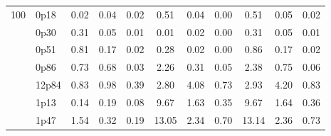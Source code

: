 \documentclass[12pt,A4paper]{article}
\begin{document}
\begin{table}[]
\begin{tabular}{lllllllllll}
\multicolumn{1}{|l|}{\multirow{13}{*}{100}} & \multicolumn{1}{l|}{0p18} & \multicolumn{1}{c|}{0.02}        & \multicolumn{1}{c|}{0.04}         & \multicolumn{1}{c|}{0.02}        & \multicolumn{1}{c|}{0.51}         & \multicolumn{1}{c|}{0.04}        & \multicolumn{1}{c|}{0.00}         & \multicolumn{1}{c|}{0.51}         & \multicolumn{1}{c|}{0.05}         & \multicolumn{1}{c|}{0.02}         \\ \cline{2-11} 
\multicolumn{1}{|l|}{} & \multicolumn{1}{l|}{0p30} & \multicolumn{1}{c|}{0.31}        & \multicolumn{1}{c|}{0.05}         & \multicolumn{1}{c|}{0.01}        & \multicolumn{1}{c|}{0.01}         & \multicolumn{1}{c|}{0.02}        & \multicolumn{1}{c|}{0.00}        & \multicolumn{1}{c|}{0.31}        & \multicolumn{1}{c|}{0.05}        & \multicolumn{1}{c|}{0.01}         \\ \cline{2-11}
\multicolumn{1}{|l|}{} & \multicolumn{1}{l|}{0p51} & \multicolumn{1}{c|}{0.81}        & \multicolumn{1}{c|}{0.17}         & \multicolumn{1}{c|}{0.02}        & \multicolumn{1}{c|}{0.28}         & \multicolumn{1}{c|}{0.02}        & \multicolumn{1}{c|}{0.00}        & \multicolumn{1}{c|}{0.86}        & \multicolumn{1}{c|}{0.17}        & \multicolumn{1}{c|}{0.02}         \\ \cline{2-11}
\multicolumn{1}{|l|}{} & \multicolumn{1}{l|}{0p86} & \multicolumn{1}{c|}{0.73}        & \multicolumn{1}{c|}{0.68}         & \multicolumn{1}{c|}{0.03}        & \multicolumn{1}{c|}{2.26}         & \multicolumn{1}{c|}{0.31}        & \multicolumn{1}{c|}{0.05}        & \multicolumn{1}{c|}{2.38}        & \multicolumn{1}{c|}{0.75}        & \multicolumn{1}{c|}{0.06}         \\ \cline{2-11}
\multicolumn{1}{|l|}{} & \multicolumn{1}{l|}{12p84} & \multicolumn{1}{c|}{0.83}        & \multicolumn{1}{c|}{0.98}         & \multicolumn{1}{c|}{0.39}        & \multicolumn{1}{c|}{2.80}         & \multicolumn{1}{c|}{4.08}        & \multicolumn{1}{c|}{0.73}        & \multicolumn{1}{c|}{2.93}        & \multicolumn{1}{c|}{4.20}        & \multicolumn{1}{c|}{0.83}         \\ \cline{2-11}
\multicolumn{1}{|l|}{} & \multicolumn{1}{l|}{1p13} & \multicolumn{1}{c|}{0.14}        & \multicolumn{1}{c|}{0.19}         & \multicolumn{1}{c|}{0.08}        & \multicolumn{1}{c|}{9.67}         & \multicolumn{1}{c|}{1.63}        & \multicolumn{1}{c|}{0.35}        & \multicolumn{1}{c|}{9.67}        & \multicolumn{1}{c|}{1.64}        & \multicolumn{1}{c|}{0.36}         \\ \cline{2-11}
\multicolumn{1}{|l|}{} & \multicolumn{1}{l|}{1p47} & \multicolumn{1}{c|}{1.54}        & \multicolumn{1}{c|}{0.32}         & \multicolumn{1}{c|}{0.19}        & \multicolumn{1}{c|}{13.05}         & \multicolumn{1}{c|}{2.34}        & \multicolumn{1}{c|}{0.70}        & \multicolumn{1}{c|}{13.14}        & \multicolumn{1}{c|}{2.36}        & \multicolumn{1}{c|}{0.73}         \\ \cline{2-11}

\end{tabular}
\end{table}
\end{document}
